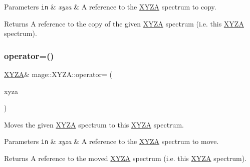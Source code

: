 \begin{DoxyParams}[1]{Parameters}
\mbox{\tt in}  & {\em xyza} & A reference to the \hyperlink{structmage_1_1_x_y_z_a}{X\+Y\+ZA} spectrum to copy. \\
\hline
\end{DoxyParams}
\begin{DoxyReturn}{Returns}
A reference to the copy of the given \hyperlink{structmage_1_1_x_y_z_a}{X\+Y\+ZA} spectrum (i.\+e. this \hyperlink{structmage_1_1_x_y_z_a}{X\+Y\+ZA} spectrum). 
\end{DoxyReturn}
\hypertarget{structmage_1_1_x_y_z_a_aad510a85c47f8023a56717778f6e2904}{}\label{structmage_1_1_x_y_z_a_aad510a85c47f8023a56717778f6e2904} 
\subsubsection{\texorpdfstring{operator=()}{operator=()}\hspace{0.1cm}{\footnotesize\ttfamily [2/2]}}
{\footnotesize\ttfamily \hyperlink{structmage_1_1_x_y_z_a}{X\+Y\+ZA}\& mage\+::\+X\+Y\+Z\+A\+::operator= (\begin{DoxyParamCaption}\item[{\hyperlink{structmage_1_1_x_y_z_a}{X\+Y\+ZA} \&\&}]{xyza }\end{DoxyParamCaption})\hspace{0.3cm}{\ttfamily [default]}}

Moves the given \hyperlink{structmage_1_1_x_y_z_a}{X\+Y\+ZA} spectrum to this \hyperlink{structmage_1_1_x_y_z_a}{X\+Y\+ZA} spectrum.


\begin{DoxyParams}[1]{Parameters}
\mbox{\tt in}  & {\em xyza} & A reference to the \hyperlink{structmage_1_1_x_y_z_a}{X\+Y\+ZA} spectrum to move. \\
\hline
\end{DoxyParams}
\begin{DoxyReturn}{Returns}
A reference to the moved \hyperlink{structmage_1_1_x_y_z_a}{X\+Y\+ZA} spectrum (i.\+e. this \hyperlink{structmage_1_1_x_y_z_a}{X\+Y\+ZA} spectrum). 
\end{DoxyReturn}

